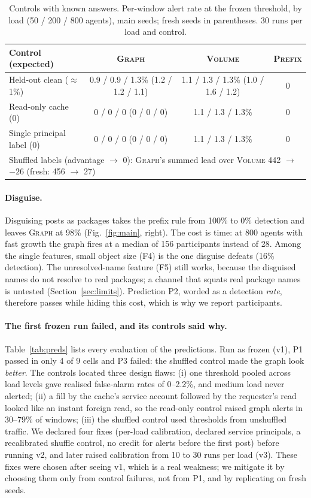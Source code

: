 \documentclass[10pt]{article}
\begin{document}
\begin{table}[t]
\centering\small
\caption{Controls with known answers. Per-window alert rate at the frozen threshold, by load (50 / 200 / 800 agents), main seeds; fresh seeds in parentheses. 30 runs per load and control.}
\label{tab:controls}
\begin{tabular}{lccc}
\toprule
Control (expected) & \textsc{Graph} & \textsc{Volume} & \textsc{Prefix}\\
\midrule
Held-out clean ($\approx$1\%) & 0.9 / 0.9 / 1.3\% (1.2 / 1.2 / 1.1) & 1.1 / 1.3 / 1.3\% (1.0 / 1.6 / 1.2) & 0\\
Read-only cache (0) & 0 / 0 / 0 (0 / 0 / 0) & 1.1 / 1.3 / 1.3\% & 0\\
Single principal label (0) & 0 / 0 / 0 (0 / 0 / 0) & 1.1 / 1.3 / 1.3\% & 0\\
\midrule
\multicolumn{4}{l}{Shuffled labels (advantage $\to$ 0): \textsc{Graph}'s summed lead over \textsc{Volume} 442 $\to$ $-26$ (fresh: 456 $\to$ 27)}\\
\bottomrule
\end{tabular}
\end{table}

\paragraph{Disguise.} Disguising posts as packages takes the prefix rule from 100\% to 0\% detection and leaves \textsc{Graph} at 98\% (Fig.~\ref{fig:main}, right). The cost is time: at 800 agents with fast growth the graph fires at a median of 156 participants instead of 28. Among the single features, small object size (F4) is the one disguise defeats (16\% detection). The unresolved-name feature (F5) still works, because the disguised names do not resolve to real packages; a channel that squats real package names is untested (Section~\ref{sec:limits}). Prediction P2, worded as a detection \emph{rate}, therefore passes while hiding this cost, which is why we report participants.

\paragraph{The first frozen run failed, and its controls said why.} Table~\ref{tab:preds} lists every evaluation of the predictions. Run as frozen (v1), P1 passed in only 4 of 9 cells and P3 failed: the shuffled control made the graph look \emph{better}. The controls located three design flaws: (i) one threshold pooled across load levels gave realised false-alarm rates of 0--2.2\%, and medium load never alerted; (ii) a fill by the cache's service account followed by the requester's read looked like an instant foreign read, so the read-only control raised graph alerts in 30--79\% of windows; (iii) the shuffled control used thresholds from unshuffled traffic. We declared four fixes (per-load calibration, declared service principals, a recalibrated shuffle control, no credit for alerts before the first post) before running v2, and later raised calibration from 10 to 30 runs per load (v3). These fixes were chosen after seeing v1, which is a real weakness; we mitigate it by choosing them only from control failures, not from P1, and by replicating on fresh seeds.
\end{document}
